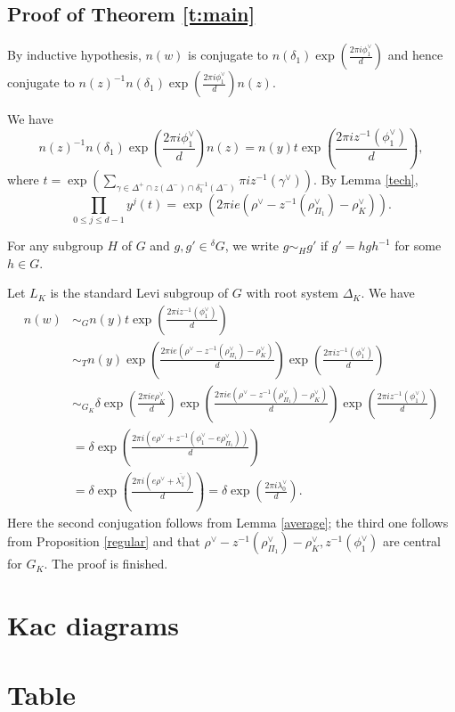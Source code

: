 \documentclass[12pt,leqno]{article}
\newtheorem{proposition}[equation]{Proposition}
\newcommand{\qed}{\hfill $\square$ \medskip}
\newenvironment{proof}[1][Proof]{\noindent\textbf{#1.} }{\qed}
\renewcommand{\sec}[1]{\section{#1}
\renewcommand{\theequation}{\thesection.\arabic{equation}}
  \setcounter{equation}{0}}
\newcommand{\g}{\mathfrak g}
\def\le{\leqslant}
\def\g{\gamma}
\def\d{\delta}
\def\D{\Delta}
\def\th{\theta}
\def\l{\lambda}
\def\i{^{-1}}
\renewcommand{\sec}[1]{\section{#1}
\renewcommand{\theequation}{\thesection.\arabic{equation}}
  \setcounter{equation}{0}}
\begin{document}
\subsection{Proof of Theorem \ref{t:main}}
\begin{comment}
\begin{proposition} \label{formula}
Let $e = d\th_1/2\pi$. Then $$n(w) \sim \d \exp(2\pi i\frac{e\rho^\vee + \overline{\l_1^\vee}}{d}).$$
\end{proposition}
Notice that $e\rho^\vee + \overline{\l_1^\vee}$ is dominant and is fixed by $\d$.

\begin{proof}
	Let $\mathcal B =z^{-1}((\D^+ \cap z(\D^-)) - \mathcal F(x z, z^{-1}))$ and $t=\exp (\pi i \sum_{\g \in \mathcal B} \g^\vee)$. Thanks to Lemma \ref{tech} below and that $y$ is elliptic for $\D_K$ we have $$\prod_{0 \le j \le d-1} y^j(t)=\exp(2\pi i e (\rho^\vee-z^{-1}(\rho_J^\vee)-\rho_K^\vee)).$$
\end{comment}
By inductive hypothesis, $n(w)$ is conjugate to $n(\d_1) \exp(\frac{2 \pi i \phi_1^\vee}{d})$ and hence conjugate to $n(z)^{-1} n(\d_1) \exp(\frac{2 \pi i \phi_1^\vee}{d}) n(z)$.

We have $$n(z)^{-1} n(\d_1) \exp(\frac{2 \pi i \phi_1^\vee}{d}) n(z)=n(y) t \exp(\frac{2 \pi i z^{-1}(\phi_1^\vee)}{d}),$$ where $t=\exp (\sum_{\g \in \D^+ \cap z(\D^-) \cap \d_1 \i(\D^-)} \pi i z^{-1}(\g^\vee))$. By Lemma \ref{tech}, $$\prod_{0 \le j \le d-1} y^j(t)=\exp(2\pi i e (\rho^\vee-z^{-1}(\rho_{\Pi_1}^\vee)-\rho_K^\vee)).$$

For any subgroup $H$ of $G$ and $g, g' \in {}^\d G$, we write $g \sim_H g'$ if $g'=h g h \i$ for some $h \in G$.

Let $L_K$ is the standard Levi subgroup of $G$ with root system $\D_K$. We have \begin{align*} n(w) &\sim_G  n(y) t \exp(\frac{2 \pi i z^{-1}(\phi_1^\vee)}{d}) \\ & \sim_T n(y) \exp(\frac{2\pi i e (\rho^\vee-z^{-1}(\rho_{\Pi_1}^\vee)-\rho_K^\vee)}{d}) \exp(\frac{2 \pi i z^{-1}(\phi_1^\vee)}{d}) \\ & \sim_{G_K} \d \exp(\frac{2 \pi i e \rho_K^\vee}{d}) \exp(\frac{2\pi i e (\rho^\vee-z^{-1}(\rho_{\Pi_1}^\vee)-\rho_K^\vee)}{d}) \exp(\frac{2 \pi i z^{-1}(\phi_1^\vee)}{d}) \\ &=\d \exp(\frac{2\pi i (e\rho^\vee + z^{-1}(\phi_1^\vee - e\rho_{\Pi_1}^\vee))}{d}) \\ &=\d \exp(\frac{2\pi i (e\rho^\vee + \overline{\l_1^\vee})}{d})=\d \exp(\frac{2 \pi i \l_0^\vee}{d}).
\end{align*} Here the second conjugation follows from Lemma \ref{average}; the third one follows from Proposition \ref{regular} and that $\rho^\vee-z^{-1}(\rho_{\Pi_1}^\vee)-\rho_K^\vee, z^{-1}(\phi_1^\vee)$ are central for $G_K$. The proof is finished.
\sec{Kac diagrams}

\sec{Table}

 

\end{document}
